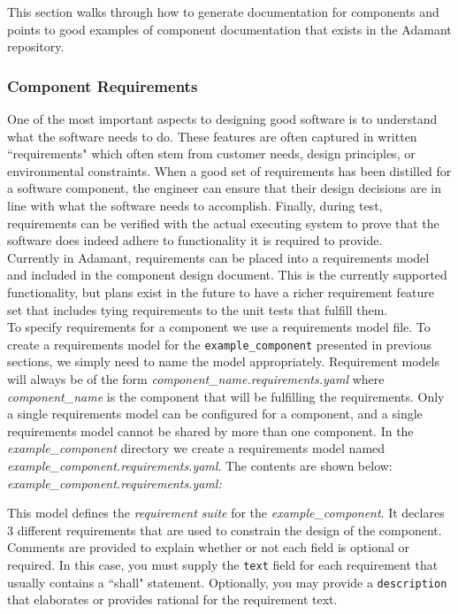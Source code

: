 This section walks through how to generate documentation for components and points to good examples of component documentation that exists in the Adamant repository.

\subsubsection{Component Requirements}

One of the most important aspects to designing good software is to understand what the software needs to do. These features are often captured in written ``requirements" which often stem from customer needs, design principles, or environmental constraints. When a good set of requirements has been distilled for a software component, the engineer can ensure that their design decisions are in line with what the software needs to accomplish. Finally, during test, requirements can be verified with the actual executing system to prove that the software does indeed adhere to functionality it is required to provide. \\

Currently in Adamant, requirements can be placed into a requirements model and included in the component design document. This is the currently supported functionality, but plans exist in the future to have a richer requirement feature set that includes tying requirements to the unit tests that fulfill them. \\

To specify requirements for a component we use a requirements model file. To create a requirements model for the \texttt{example\_component} presented in previous sections, we simply need to name the model appropriately. Requirement models will always be of the form \textit{component\_name.requirements.yaml} where \textit{component\_name} is the component that will be fulfilling the requirements. Only a single requirements model can be configured for a component, and a single requirements model cannot be shared by more than one component. In the \textit{example\_component} directory we create a requirements model named \textit{example\_component.requirements.yaml}. The contents are shown below: \\

\textit{example\_component.requirements.yaml:}

This model defines the \textit{requirement suite} for the \textit{example\_component}. It declares 3 different requirements that are used to constrain the design of the component. Comments are provided to explain whether or not each field is optional or required. In this case, you must supply the \texttt{text} field for each requirement that usually contains a ``shall" statement. Optionally, you may provide a \texttt{description} that elaborates or provides rational for the requirement text. \\

